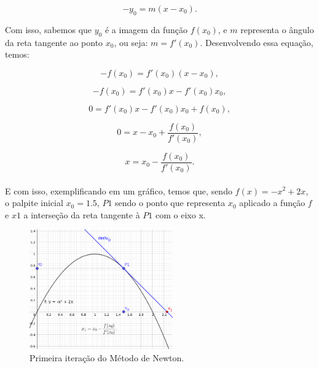 \begin{equation}
    -y_0=m(x-x_0).
\end{equation}

Com isso, sabemos que $y_0$ é a imagem da função $f(x_0)$, e $m$ representa o
ângulo da reta tangente ao ponto $x_0$, ou seja: $m=f'(x_0)$. Desenvolvendo
essa equação, temos:

\begin{equation}
    -f(x_0) = f'(x_0)(x-x_0),
\end{equation}

\begin{equation}
    -f(x_0) = f'(x_0)x - f'(x_0)x_0,
\end{equation}

\begin{equation}
    0 = f'(x_0)x - f'(x_0)x_0+f(x_0),
\end{equation}

\begin{equation}
    0 = x - x_0 + \frac{f(x_0)}{f'(x_0)},
\end{equation}

\begin{equation}
    x = x_0 - \frac {f(x_0)}{f'(x_0)}.
\end{equation}\\

E com isso, exemplificando em um gráfico, temos que, sendo $f(x)=-x^2+2x$, o
palpite inicial $x_0=1.5$, $P1$ sendo o ponto que representa $x_0$ aplicado
a função $f$ e $x1$ a interseção da reta tangente à $P1$ com o eixo x.

\begin{figure}[ht]
    \includegraphics[width=0.55\textwidth]
      {src/MetodoNewton_grafico_1.png}
    \centering
    \caption{
      Primeira iteração do Método de Newton.
     }
    \label{MetodoNewton_grafico_1}
\end{figure}


